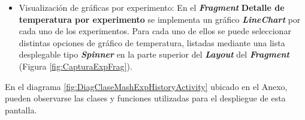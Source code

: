 \begin{itemize}
                 \item Visualización de gráficas por experimento: En el \textbf{\textit{\gls{Fragment}}} \textbf{Detalle de temperatura por experimento} se implementa un gráfico \textbf{\textit{\gls{LineChart}}} por cada uno de los experimentos. Para cada uno de ellos se puede seleccionar distintas opciones de gráfico de temperatura, listadas mediante una lista desplegable tipo \textbf{\textit{\gls{Spinner}}} en la parte superior del \textbf{\textit{\gls{Layout}}} del \textbf{\textit{\gls{Fragment}}} (Figura \ref{fig:CapturaExpFrag}).
             \end{itemize}
             
            \par En el diagrama \ref{fig:DiagClaseMashExpHistoryActivity} ubicado en el Anexo, pueden observarse las clases y funciones utilizadas para el despliegue de esta pantalla.
            
            
            
